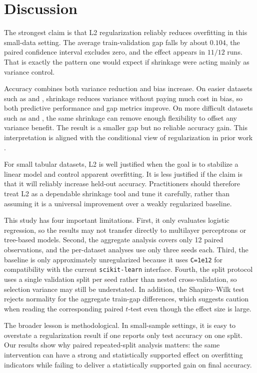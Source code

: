 \section{Discussion}
\label{sec:discussion}

 The strongest claim is that L2 regularization reliably reduces overfitting in this small-data setting. The average train-validation gap falls by about $0.104$, the paired confidence interval excludes zero, and the effect appears in $11/12$ runs. That is exactly the pattern one would expect if shrinkage were acting mainly as variance control.

 Accuracy combines both variance reduction and bias increase. On easier datasets such as \breastcancer and \wine, shrinkage reduces variance without paying much cost in bias, so both predictive performance and gap metrics improve. On more difficult datasets such as \sonar and \glass, the same shrinkage can remove enough flexibility to offset any variance benefit. The result is a smaller gap but no reliable accuracy gain. This interpretation is aligned with the conditional view of regularization in prior work \cite{zhang2017understanding,power2022grokking,dangelo2024weight}.

 For small tabular datasets, L2 is well justified when the goal is to stabilize a linear model and control apparent overfitting. It is less justified if the claim is that it will reliably increase held-out accuracy. Practitioners should therefore treat L2 as a dependable shrinkage tool and tune it carefully, rather than assuming it is a universal improvement over a weakly regularized baseline.

 This study has four important limitations. First, it only evaluates logistic regression, so the results may not transfer directly to multilayer perceptrons or tree-based models. Second, the aggregate analysis covers only 12 paired observations, and the per-dataset analyses use only three seeds each. Third, the baseline is only approximately unregularized because it uses \texttt{C=1e12} for compatibility with the current \texttt{scikit-learn} interface. Fourth, the split protocol uses a single validation split per seed rather than nested cross-validation, so selection variance may still be understated. In addition, the Shapiro--Wilk test rejects normality for the aggregate train-gap differences, which suggests caution when reading the corresponding paired $t$-test even though the effect size is large.

 The broader lesson is methodological. In small-sample settings, it is easy to overstate a regularization result if one reports only test accuracy on one split. Our results show why paired repeated-split analysis matters: the same intervention can have a strong and statistically supported effect on overfitting indicators while failing to deliver a statistically supported gain on final accuracy.

